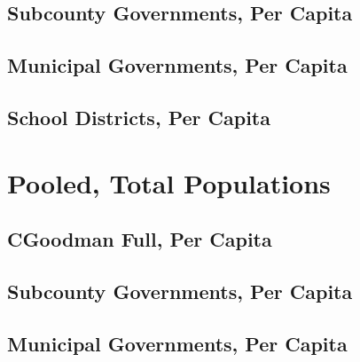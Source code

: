 \documentclass{article}
\begin{document}
\subsection{Subcounty Governments, Per Capita}


\clearpage

\clearpage


\subsection{Municipal Governments, Per Capita}


\clearpage


\subsection{School Districts, Per Capita}


\clearpage




\section{Pooled, Total Populations}


\subsection{CGoodman Full, Per Capita}


\clearpage

\clearpage


\subsection{Subcounty Governments, Per Capita}


\clearpage

\clearpage


\subsection{Municipal Governments, Per Capita}


\clearpage

\clearpage
\end{document}
